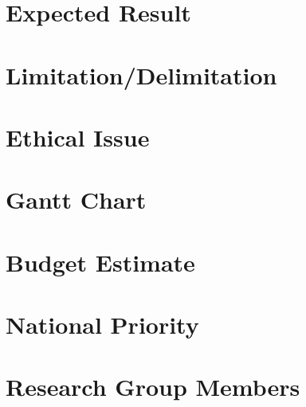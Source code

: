 \documentclass[12pt, a4paper]{article}
\renewcommand{\arraystretch}{1.5}
\begin{document}
\section{Expected Result}


\section{Limitation/Delimitation}


\section{Ethical Issue}


\section{Gantt Chart}


\section{Budget Estimate}
 


\section{National Priority}


\section{Research Group Members}



\renewcommand{\arraystretch}{1.5}
\end{document}
